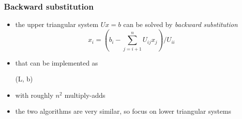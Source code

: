 \begin{frame}[fragile]
%
  \frametitle{Backward substitution}
%
  \begin{itemize}
%
%
  \item the upper triangular system $Ux = b$ can be solved by {\em backward substitution}
    \begin{equation}
      x_{i} = \left( b_{i} - \sum_{j=i+1}^{n} U_{ij}x_{j} \right) / U_{ii}
    \end{equation}
%
  \item that can be implemented as
    \begin{center}
      \begin{minipage}{.85\linewidth}
        \begin{algorithm}[H]
          \label{alg:backward-substitution}
%
          \DontPrintSemicolon
          \SetAlCapHSkip{0ex}
%
          \caption{\backsub(L, b)}
%
%
        \end{algorithm}
      \end{minipage}
    \end{center}
%
  \item with roughly $n^{2}$ multiply-adds
%
  \item the two algorithms are very similar, so focus on lower triangular systems
%
  \end{itemize}
%
\end{frame}

